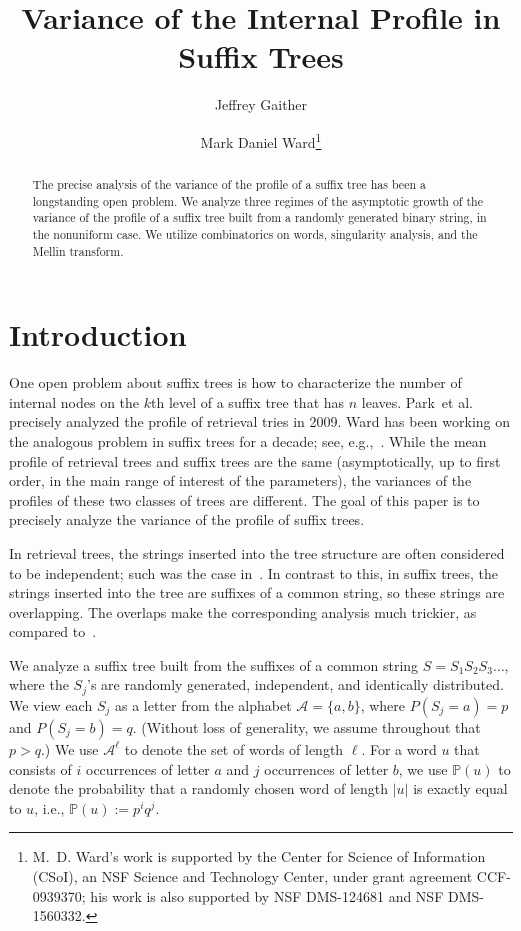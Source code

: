 \documentclass[proceedings]{aofa}
\author[J. Gaither and M.~D. Ward]{Jeffrey Gaither\addressmark{1}\and
  Mark Daniel Ward\addressmark{2}\thanks{M.~D. Ward's work is
    supported by the Center for Science of Information (CSoI), an NSF
    Science and Technology Center, under grant agreement CCF-0939370;
    his work is also supported by NSF DMS-124681 and NSF DMS-1560332.}}
\title{Variance of the Internal Profile in Suffix Trees}
\newcommand{\pro}{\mathbb{P}}
\newcommand{\A}{\mathcal{A}}
\newcommand{\Pu}{\pro(u)}
\begin{document}
\maketitle
\begin{abstract}
The precise analysis of the variance of the profile of a suffix tree
has been a longstanding open problem.
We analyze three regimes of 
the asymptotic growth of the variance of the profile of a
suffix tree built from a randomly generated binary string,
in the nonuniform case.  We utilize
combinatorics on words, singularity analysis, and the Mellin transform.
\end{abstract}

\section{Introduction}

One open problem about suffix trees is how to characterize the number
of internal nodes on the $k$th level of a suffix tree that has $n$ leaves.
Park~et al.~\cite{Park:2009} precisely analyzed the profile of
retrieval tries in 2009.  
Ward has been working on the analogous problem in suffix trees for a
decade; see, e.g.,~\cite{NicodemeWard:2011,Ward:2007}.
While the mean profile of retrieval trees and suffix trees are 
the same (asymptotically, up to first order, in the main range of
interest of the parameters), the variances of the profiles of these
two classes of trees are different.  The goal of this paper is to
precisely analyze the variance of the profile of suffix trees.

In retrieval trees, the strings inserted
into the tree structure are often considered to be independent;
such was the case in~\cite{Park:2009}.  In contrast to this, in
suffix trees, the strings inserted into the tree are suffixes of a
common string, so these strings are overlapping.  The overlaps
make the corresponding analysis much trickier, as compared to~\cite{Park:2009}.

We analyze a suffix tree built from the suffixes of a common string
$S = S_{1}S_{2}S_{3}\ldots$, where the $S_{j}$'s are randomly
generated, independent, and identically distributed.  We view each
$S_{j}$ as a letter from the alphabet $\A = \{a,b\}$, where $P(S_{j} =
a) = p$ and $P(S_{j} = b) = q$.  (Without loss of generality, we
assume throughout that $p > q$.)  
We use $\A^{\ell}$ to denote the set of words of length $\ell$.
For a word $u$ that consists of $i$ occurrences of letter
$a$ and $j$ occurrences of letter $b$, we use $\Pu$ to denote the
probability that a randomly chosen word of length $|u|$ is exactly
equal to $u$, i.e., $\Pu := p^{i}q^{j}$.
\end{document}
